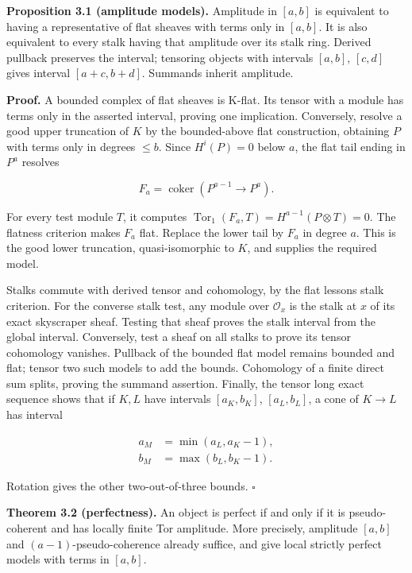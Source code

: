 \documentclass[
  english,
  11pt,
  a4paper,
]{article}
\begin{document}
\textbf{Proposition 3.1 (amplitude models).} Amplitude in \([a,b]\) is
equivalent to having a representative of flat sheaves with terms only in
\([a,b]\). It is also equivalent to every stalk having that amplitude
over its stalk ring. Derived pullback preserves the interval; tensoring
objects with intervals \([a,b]\), \([c,d]\) gives interval
\([a+c,b+d]\). Summands inherit amplitude.

\textbf{Proof.} A bounded complex of flat sheaves is K-flat. Its tensor
with a module has terms only in the asserted interval, proving one
implication. Conversely, resolve a good upper truncation of \(K\) by the
bounded-above flat construction, obtaining \(P\) with terms only in
degrees \(\le b\). Since \(H^i(P)=0\) below \(a\), the flat tail ending
in \(P^a\) resolves

\[F_a=\operatorname{coker}(P^{a-1}\to P^a).
\tag{3.1}\]

For every test module \(T\), it computes
\(\operatorname{Tor}_1(F_a,T)=H^{a-1}(P\otimes T)=0\). The flatness
criterion makes \(F_a\) flat. Replace the lower tail by \(F_a\) in
degree \(a\). This is the good lower truncation, quasi-isomorphic to
\(K\), and supplies the required model.

Stalks commute with derived tensor and cohomology, by the flat
lesson\textquotesingle s stalk criterion. For the converse stalk test,
any module over \(\mathcal O_x\) is the stalk at \(x\) of its exact
skyscraper sheaf. Testing that sheaf proves the stalk interval from the
global interval. Conversely, test a sheaf on all stalks to prove its
tensor cohomology vanishes. Pullback of the bounded flat model remains
bounded and flat; tensor two such models to add the bounds. Cohomology
of a finite direct sum splits, proving the summand assertion. Finally,
the tensor long exact sequence shows that if \(K,L\) have intervals
\([a_K,b_K]\), \([a_L,b_L]\), a cone of \(K\to L\) has interval

\[\begin{aligned}
a_M&=\min(a_L,a_K-1),\\
b_M&=\max(b_L,b_K-1).
\end{aligned}
\tag{3.2}\]

Rotation gives the other two-out-of-three bounds. \(\square\)

\textbf{Theorem 3.2 (perfectness).} An object is perfect if and only if
it is pseudo-coherent and has locally finite Tor amplitude. More
precisely, amplitude \([a,b]\) and \((a-1)\)-pseudo-coherence already
suffice, and give local strictly perfect models with terms in \([a,b]\).
\end{document}
